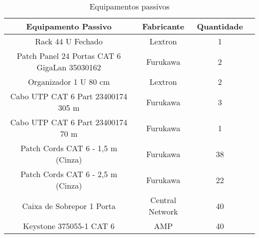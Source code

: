 \begin{table}[h!]
\caption{Equipamentos passivos}
\label{tab8}
\begin{center}
	\renewcommand{\arraystretch}{1.2}
	\begin{tabular}{|c|c|c|c|}
		\hline
		\textbf{Equipamento Passivo}      & \textbf{Fabricante} & \multicolumn{1}{l|}{\textbf{Quantidade}} \\ \hline
		Rack 44 U Fechado                 & Lextron             & 1                                \\ \hline
		Patch Panel 24 Portas CAT 6 GigaLan 35030162     & Furukawa          & 2                                \\ \hline
		Organizador 1 U 80 cm            & Lextron             & 2                               \\ \hline
		Cabo UTP CAT 6 Part 23400174 305 m                  & Furukawa            & 3        \\ \hline
			Cabo UTP CAT 6 Part 23400174 70 m                  & Furukawa            & 1        \\ \hline
	
		Patch Cords CAT 6 - 1,5 m (Cinza) & Furukawa                 & 38                            \\ \hline
		Patch Cords CAT 6 - 2,5 m (Cinza) & Furukawa                 & 22                             \\ \hline
		Caixa de Sobrepor 1 Porta              & Central Network              & 40                             \\ \hline
		Keystone 375055-1
		 CAT 6                   & AMP              & 40                             \\ \hline
	\end{tabular}
\end{center}
\end{table}
